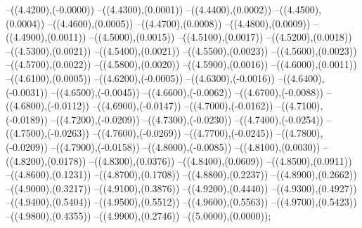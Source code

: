 {	--({\sx*(4.4200)},{\sy*(-0.0000)})
	--({\sx*(4.4300)},{\sy*(0.0001)})
	--({\sx*(4.4400)},{\sy*(0.0002)})
	--({\sx*(4.4500)},{\sy*(0.0004)})
	--({\sx*(4.4600)},{\sy*(0.0005)})
	--({\sx*(4.4700)},{\sy*(0.0008)})
	--({\sx*(4.4800)},{\sy*(0.0009)})
	--({\sx*(4.4900)},{\sy*(0.0011)})
	--({\sx*(4.5000)},{\sy*(0.0015)})
	--({\sx*(4.5100)},{\sy*(0.0017)})
	--({\sx*(4.5200)},{\sy*(0.0018)})
	--({\sx*(4.5300)},{\sy*(0.0021)})
	--({\sx*(4.5400)},{\sy*(0.0021)})
	--({\sx*(4.5500)},{\sy*(0.0023)})
	--({\sx*(4.5600)},{\sy*(0.0023)})
	--({\sx*(4.5700)},{\sy*(0.0022)})
	--({\sx*(4.5800)},{\sy*(0.0020)})
	--({\sx*(4.5900)},{\sy*(0.0016)})
	--({\sx*(4.6000)},{\sy*(0.0011)})
	--({\sx*(4.6100)},{\sy*(0.0005)})
	--({\sx*(4.6200)},{\sy*(-0.0005)})
	--({\sx*(4.6300)},{\sy*(-0.0016)})
	--({\sx*(4.6400)},{\sy*(-0.0031)})
	--({\sx*(4.6500)},{\sy*(-0.0045)})
	--({\sx*(4.6600)},{\sy*(-0.0062)})
	--({\sx*(4.6700)},{\sy*(-0.0088)})
	--({\sx*(4.6800)},{\sy*(-0.0112)})
	--({\sx*(4.6900)},{\sy*(-0.0147)})
	--({\sx*(4.7000)},{\sy*(-0.0162)})
	--({\sx*(4.7100)},{\sy*(-0.0189)})
	--({\sx*(4.7200)},{\sy*(-0.0209)})
	--({\sx*(4.7300)},{\sy*(-0.0230)})
	--({\sx*(4.7400)},{\sy*(-0.0254)})
	--({\sx*(4.7500)},{\sy*(-0.0263)})
	--({\sx*(4.7600)},{\sy*(-0.0269)})
	--({\sx*(4.7700)},{\sy*(-0.0245)})
	--({\sx*(4.7800)},{\sy*(-0.0209)})
	--({\sx*(4.7900)},{\sy*(-0.0158)})
	--({\sx*(4.8000)},{\sy*(-0.0085)})
	--({\sx*(4.8100)},{\sy*(0.0030)})
	--({\sx*(4.8200)},{\sy*(0.0178)})
	--({\sx*(4.8300)},{\sy*(0.0376)})
	--({\sx*(4.8400)},{\sy*(0.0609)})
	--({\sx*(4.8500)},{\sy*(0.0911)})
	--({\sx*(4.8600)},{\sy*(0.1231)})
	--({\sx*(4.8700)},{\sy*(0.1708)})
	--({\sx*(4.8800)},{\sy*(0.2237)})
	--({\sx*(4.8900)},{\sy*(0.2662)})
	--({\sx*(4.9000)},{\sy*(0.3217)})
	--({\sx*(4.9100)},{\sy*(0.3876)})
	--({\sx*(4.9200)},{\sy*(0.4440)})
	--({\sx*(4.9300)},{\sy*(0.4927)})
	--({\sx*(4.9400)},{\sy*(0.5404)})
	--({\sx*(4.9500)},{\sy*(0.5512)})
	--({\sx*(4.9600)},{\sy*(0.5563)})
	--({\sx*(4.9700)},{\sy*(0.5423)})
	--({\sx*(4.9800)},{\sy*(0.4355)})
	--({\sx*(4.9900)},{\sy*(0.2746)})
	--({\sx*(5.0000)},{\sy*(0.0000)});
}
